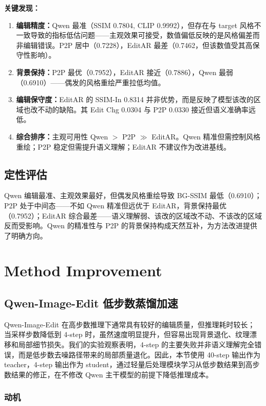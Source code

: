 \documentclass[UTF8,11pt,a4paper,fontset=fandol]{ctexart}
\begin{document}
\textbf{关键发现：}
\begin{enumerate}
  \item \textbf{编辑精度：}Qwen 最准（SSIM 0.7804, CLIP 0.9992），但存在与 target 风格不一致导致的指标低估问题——主观效果可接受，数值偏低反映的是风格偏差而非编辑错误。P2P 居中（0.7228），EditAR 最差（0.7462，但该数值受其高保守性影响）。
  \item \textbf{背景保持：}P2P 最优（0.7952），EditAR 接近（0.7886），Qwen 最弱（0.6910）——偶发的风格重绘严重拉低均值。
  \item \textbf{编辑保守度：}EditAR 的 SSIM-In 0.8314 并非优势，而是反映了模型该改的区域也改不动的缺陷。其 Edit Chg 0.0304 与 P2P 0.0330 接近但语义准确率远低。
  \item \textbf{综合排序：}主观可用性 Qwen $>$ P2P $\gg$ EditAR。Qwen 精准但需控制风格重绘；P2P 稳定但需提升语义理解；EditAR 不建议作为改进基线。
\end{enumerate}

\subsection{定性评估}
Qwen 编辑最准、主观效果最好，但偶发风格重绘导致 BG-SSIM 最低（0.6910）；P2P 处于中间态——不如 Qwen 精准但远优于 EditAR，背景保持最优（0.7952）；EditAR 综合最差——语义理解弱、该改的区域改不动、不该改的区域反而受影响。Qwen 的精准性与 P2P 的背景保持构成天然互补，为方法改进提供了明确方向。

\section{Method Improvement}

\subsection{Qwen-Image-Edit 低步数蒸馏加速}
\label{sec:distill}

Qwen-Image-Edit 在高步数推理下通常具有较好的编辑质量，但推理耗时较长；当采样步数降低到 4-step 时，虽然速度明显提升，但容易出现背景退化、纹理漂移和局部细节损失。我们的实验观察表明，4-step 的主要失败并非语义理解完全错误，而是低步数去噪路径带来的局部质量退化。因此，本节使用 40-step 输出作为 teacher，4-step 输出作为 student，通过轻量后处理模块学习从低步数结果到高步数结果的修正，在不修改 Qwen 主干模型的前提下降低推理成本。

\subsubsection{动机}
\end{document}

